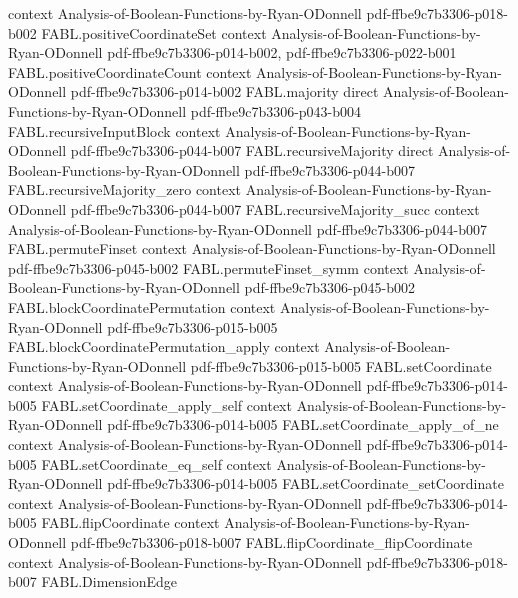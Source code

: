 \begin{theorem}
  {context}
  {Analysis-of-Boolean-Functions-by-Ryan-ODonnell}
  {pdf-ffbe9c7b3306-p018-b002}
\proofstep
  {FABL.positiveCoordinateSet}
  {context}
  {Analysis-of-Boolean-Functions-by-Ryan-ODonnell}
  {pdf-ffbe9c7b3306-p014-b002,
    pdf-ffbe9c7b3306-p022-b001}
\proofstep
  {FABL.positiveCoordinateCount}
  {context}
  {Analysis-of-Boolean-Functions-by-Ryan-ODonnell}
  {pdf-ffbe9c7b3306-p014-b002}
\proofstep
  {FABL.majority}
  {direct}
  {Analysis-of-Boolean-Functions-by-Ryan-ODonnell}
  {pdf-ffbe9c7b3306-p043-b004}
\proofstep
  {FABL.recursiveInputBlock}
  {context}
  {Analysis-of-Boolean-Functions-by-Ryan-ODonnell}
  {pdf-ffbe9c7b3306-p044-b007}
\proofstep
  {FABL.recursiveMajority}
  {direct}
  {Analysis-of-Boolean-Functions-by-Ryan-ODonnell}
  {pdf-ffbe9c7b3306-p044-b007}
\proofstep
  {FABL.recursiveMajority_zero}
  {context}
  {Analysis-of-Boolean-Functions-by-Ryan-ODonnell}
  {pdf-ffbe9c7b3306-p044-b007}
\proofstep
  {FABL.recursiveMajority_succ}
  {context}
  {Analysis-of-Boolean-Functions-by-Ryan-ODonnell}
  {pdf-ffbe9c7b3306-p044-b007}
\proofstep
  {FABL.permuteFinset}
  {context}
  {Analysis-of-Boolean-Functions-by-Ryan-ODonnell}
  {pdf-ffbe9c7b3306-p045-b002}
\proofstep
  {FABL.permuteFinset_symm}
  {context}
  {Analysis-of-Boolean-Functions-by-Ryan-ODonnell}
  {pdf-ffbe9c7b3306-p045-b002}
\proofstep
  {FABL.blockCoordinatePermutation}
  {context}
  {Analysis-of-Boolean-Functions-by-Ryan-ODonnell}
  {pdf-ffbe9c7b3306-p015-b005}
\proofstep
  {FABL.blockCoordinatePermutation_apply}
  {context}
  {Analysis-of-Boolean-Functions-by-Ryan-ODonnell}
  {pdf-ffbe9c7b3306-p015-b005}
\proofstep
  {FABL.setCoordinate}
  {context}
  {Analysis-of-Boolean-Functions-by-Ryan-ODonnell}
  {pdf-ffbe9c7b3306-p014-b005}
\proofstep
  {FABL.setCoordinate_apply_self}
  {context}
  {Analysis-of-Boolean-Functions-by-Ryan-ODonnell}
  {pdf-ffbe9c7b3306-p014-b005}
\proofstep
  {FABL.setCoordinate_apply_of_ne}
  {context}
  {Analysis-of-Boolean-Functions-by-Ryan-ODonnell}
  {pdf-ffbe9c7b3306-p014-b005}
\proofstep
  {FABL.setCoordinate_eq_self}
  {context}
  {Analysis-of-Boolean-Functions-by-Ryan-ODonnell}
  {pdf-ffbe9c7b3306-p014-b005}
\proofstep
  {FABL.setCoordinate_setCoordinate}
  {context}
  {Analysis-of-Boolean-Functions-by-Ryan-ODonnell}
  {pdf-ffbe9c7b3306-p014-b005}
\proofstep
  {FABL.flipCoordinate}
  {context}
  {Analysis-of-Boolean-Functions-by-Ryan-ODonnell}
  {pdf-ffbe9c7b3306-p018-b007}
\proofstep
  {FABL.flipCoordinate_flipCoordinate}
  {context}
  {Analysis-of-Boolean-Functions-by-Ryan-ODonnell}
  {pdf-ffbe9c7b3306-p018-b007}
\proofstep
  {FABL.DimensionEdge}

\end{theorem}
